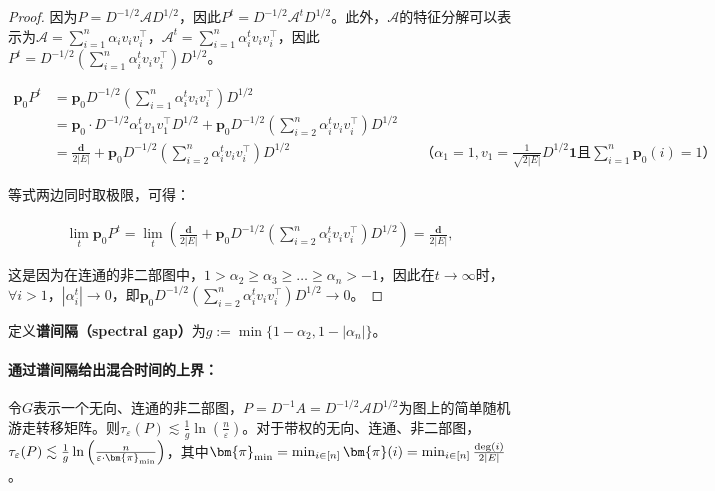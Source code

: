 \documentclass[lang=cn,newtx,10pt,scheme=chinese,chinesefont=nofont,citestyle=gb7714-2015, bibstyle=gb7714-2015]{elegantbook}
\begin{document}
\begin{refsection}
\begin{proof}
    因为$P=D^{-1/2}\mathcal{A}D^{1/2}$，因此$P^t=D^{-1/2}\mathcal{A}^tD^{1/2}$。此外，$\mathcal{A}$的特征分解可以表示为$\mathcal{A}=\sum_{i=1}^n{\alpha_iv_iv_i^{\top}}$，$\mathcal{A}^t=\sum_{i=1}^n{\alpha_i^tv_iv_i^{\top}}$，因此$P^t=D^{-1/2}\left(\sum_{i=1}^n{\alpha_i^tv_iv_i^{\top}}\right)D^{1/2}$。
                    
    \begin{align*}
        \bm{p}_0P^t&=\bm{p}_0D^{-1/2}\left(\sum_{i=1}^n{\alpha_i^tv_iv_i^{\top}}\right)D^{1/2}\\
        &=\bm{p}_0\cdot D^{-1/2}\alpha_1^tv_1v_1^{\top}D^{1/2}+\bm{p}_0D^{-1/2}\left(\sum_{i=2}^n{\alpha_i^tv_iv_i^{\top}}\right)D^{1/2}\\
        &=\frac{\bm{d}}{2|E|}+\bm{p}_0D^{-1/2}\left(\sum_{i=2}^n{\alpha_i^tv_iv_i^{\top}}\right)D^{1/2}&&\text{（$\alpha_1=1,v_1=\frac{1}{\sqrt{2|E|}}D^{1/2}\bm{1}$且$\sum_{i=1}^n\bm{p}_0(i)=1$）}
    \end{align*}

    等式两边同时取极限，可得：
                    
    \begin{align*}
        \lim_t \bm{p}_0P^t =\lim_t \left(\frac{\bm{d}}{2|E|}+\bm{p}_0D^{-1/2}\left(\sum_{i=2}^n{\alpha_i^tv_iv_i^{\top}}\right)D^{1/2}\right)=\frac{\bm{d}}{2|E|},
    \end{align*}

    这是因为在连通的非二部图中，$1>\alpha_2\ge \alpha_3\ge \dots\ge \alpha_n>-1$，因此在$t\to \infty$时，$\forall i>1$，${|\alpha_i^t|}\to 0$，即$\bm{p}_0D^{-1/2}\left(\sum_{i=2}^n{\alpha_i^tv_iv_i^{\top}}\right)D^{1/2}\to 0$。
\end{proof}

定义\textbf{谱间隔（spectral gap）}为$g:=\min\{1-\alpha_2,1-|\alpha_n|\}$。

\paragraph{通过谱间隔给出混合时间的上界：}

\begin{theorem}
    \label{thrm:mixing-time-g-sg}
    令$G$表示一个无向、连通的非二部图，$P=D^{-1}A=D^{-1/2}\mathcal{A}D^{1/2}$为图上的简单随机游走转移矩阵。则$\tau_{\varepsilon}(P)\lesssim\frac{1}{g}\ln{\left(\frac{n}{\varepsilon}\right)}$。对于带权的无向、连通、非二部图，$\tau_{\varepsilon}(P)\lesssim\frac{1}{g}\ln{\left(\frac{n}{\varepsilon\cdot \bm{\pi}_{\textup{min}}}\right)}$，其中$\bm{\pi}_{\textup{min}}=\min_{i\in[n]}{\bm{\pi}(i)}=\min_{i\in [n]}{\frac{\textup{deg}(i)}{2|E|}}$。




\end{theorem}
\end{refsection}
\end{document}
